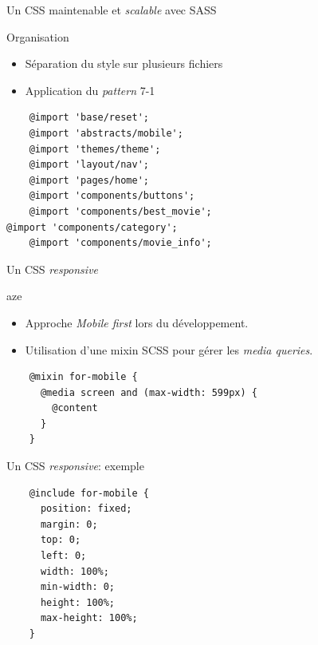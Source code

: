\begin{frame}[fragile]{Un CSS maintenable et \textit{scalable} avec SASS}  
  \begin{block}{Organisation}
    \begin{itemize}
    \item Séparation du style sur plusieurs fichiers
    \item Application du \textit{pattern} 7-1
    \end{itemize}
  \end{block}

  \begin{verbatim}
    @import 'base/reset';
    @import 'abstracts/mobile';
    @import 'themes/theme';
    @import 'layout/nav';
    @import 'pages/home';
    @import 'components/buttons';
    @import 'components/best_movie';                                                                                                                 @import 'components/category';
    @import 'components/movie_info';
  \end{verbatim}

\end{frame}

\begin{frame}[fragile]{Un CSS \textit{responsive}}
  \begin{block}{aze}
    \begin{itemize}
    \item Approche \textit{Mobile first} lors du développement.
    \item Utilisation d'une mixin SCSS pour gérer les \textit{media queries}.
    \end{itemize}
  \end{block}
  
  \begin{verbatim}
    @mixin for-mobile {
      @media screen and (max-width: 599px) {
        @content
      }
    }
  \end{verbatim}
\end{frame}

\begin{frame}[fragile]{Un CSS \textit{responsive}: exemple}
  
  \begin{verbatim}
    @include for-mobile {
      position: fixed;
      margin: 0;
      top: 0;
      left: 0;
      width: 100%;
      min-width: 0;
      height: 100%;
      max-height: 100%;
    }
  \end{verbatim}
\end{frame}

